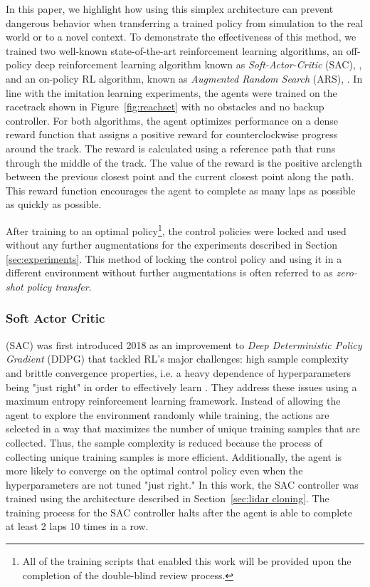 \documentclass[manuscript,screen,review]{acmart}
\newcommand{\figref}[1]{Figure~\ref{#1}}
\begin{document}
In this paper, we highlight how using this simplex architecture can prevent dangerous behavior when transferring a trained policy from simulation to the real world or to a novel context.
To demonstrate the effectiveness of this method, we trained two well-known state-of-the-art reinforcement learning algorithms, an off-policy deep reinforcement learning algorithm known as \emph{Soft-Actor-Critic} (SAC), \cite{haarnoja2018soft}, and an on-policy RL algorithm, known as \emph{Augmented Random Search} (ARS), \cite{mania2018simple}. %
In line with the imitation learning experiments, the agents were trained on the racetrack shown in \figref{fig:reachset} with no obstacles and no backup controller. For both algorithms, the agent optimizes performance on a dense reward function that assigns a positive reward for counterclockwise progress around the track. The reward is calculated using a reference path that runs through the middle of the track. The value of the reward is the positive arclength between the previous closest point and the current closest point along the path. This reward function encourages the agent to complete as many laps as possible as quickly as possible.

After training to an optimal policy\footnote{All of the training scripts that enabled this work will be provided upon the completion of the double-blind review process.}, the control policies were locked and used without any further augmentations for the experiments described in Section \ref{sec:experiments}. This method of locking the control policy and using it in a different environment without further augmentations is often referred to as \emph{zero-shot policy transfer}.


\subsubsection{Soft Actor Critic}
(SAC) was first introduced 2018 as an improvement to \emph{Deep Deterministic Policy Gradient} (DDPG) that tackled RL's major challenges: high sample complexity and brittle convergence properties, i.e. a heavy dependence of hyperparameters being "just right" in order to effectively learn \cite{haarnoja2018soft}. They address these issues using a maximum entropy reinforcement learning framework. Instead of allowing the agent to explore the environment randomly while training, the actions are selected in a way that maximizes the number of unique training samples that are collected. Thus, the sample complexity is reduced because the process of collecting unique training samples is more efficient. Additionally, the agent is more likely to converge on the optimal control policy even when the hyperparameters are not tuned "just right." In this work, the SAC controller was trained
using the architecture described in Section~\ref{sec:lidar cloning}. The training process for the SAC controller halts after the agent is able to complete at least 2 laps 10 times in a row.
\end{document}
